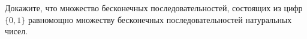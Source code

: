 Докажите, что множество бесконечных последовательностей, состоящих из цифр $\{0, 1\}$ равномощно множеству бесконечных
последовательностей натуральных чисел.